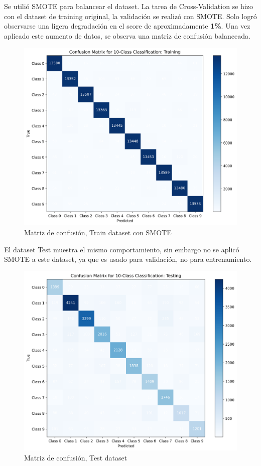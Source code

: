 \documentclass[journal]{IEEEtran}
\begin{document}
Se utilió SMOTE\cite{smote2023} para balancear el dataset. La tarea de Cross-Validation se hizo con el dataset de training original, la validación se realizó con SMOTE. Solo logró observarse una ligera degradación en el score de aproximadamente \textbf{1\%}. Una vez aplicado este aumento de datos, se observa una matriz de confusión balanceada.

\begin{figure}[H]
        \centering
        \includegraphics[width=\linewidth]{figures/confusion_matrix_Training_wSMOTE.png}
        \caption{Matriz de confusión, Train dataset con SMOTE}
        \label{fig:confusion_matrix_post_smote}
\end{figure}

El dataset Test muestra el mismo comportamiento, sin embargo no se aplicó SMOTE a este dataset, ya que es usado para validación, no para entrenamiento.

\begin{figure}[H]
        \centering
        \includegraphics[width=\linewidth]{figures/confusion_matrix_Testing_wSMOTE.png}
        \caption{Matriz de confusión, Test dataset}
        \label{fig:confusion_matrix_test}
\end{figure}
\end{document}

